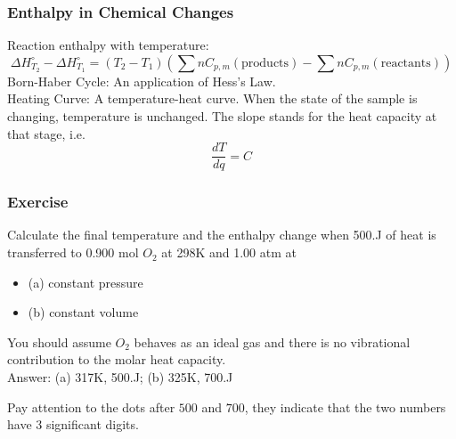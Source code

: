 \documentclass[aspectratio=169]{beamer}
\def\blankline{\\[6pt]}
\begin{document}
  \begin{frame}
    \frametitle{Enthalpy in Chemical Changes}
    Reaction enthalpy with temperature: 
    $$\Delta H_{T_2}^{\circ} - \Delta H_{T_1}^{\circ} = (T_2 - T_1)\left(\sum n C_{p, m}(\text{products}) - \sum n C_{p, m}(\text{reactants}) \right)$$
    Born-Haber Cycle: An application of Hess's Law.
    \blankline
    Heating Curve: A temperature-heat curve. When the state of the sample is changing, 
    temperature is unchanged. The slope stands for the heat capacity at that stage, i.e.
    $$\frac{dT}{dq} = C$$
  \end{frame}
  \begin{frame}
    \frametitle{Exercise}
    Calculate the final temperature and the enthalpy change when 500.J of heat is transferred to 0.900 mol $O_2$ at 298K and 1.00 atm at
    \begin{itemize}
      \item (a) constant pressure
      \item (b) constant volume
    \end{itemize}
    You should assume $O_2$ behaves as an ideal gas and there is no vibrational contribution to the molar heat capacity.
    \pause
    \blankline
    Answer: (a) 317K, 500.J; (b) 325K, 700.J 

    Pay attention to the dots after $500$ and $700$, they indicate that the two numbers have 3 significant digits.
  \end{frame}
\end{document}
